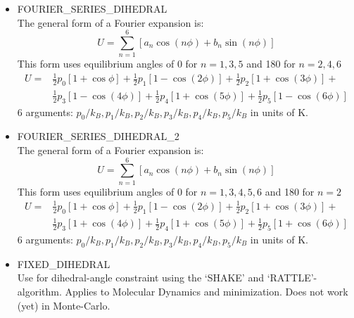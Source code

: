 \begin{itemize}
  \item{FOURIER\_SERIES\_DIHEDRAL}\\
  The general form of a Fourier expansion is:
  \begin{equation}
  U=\sum_{n=1}^6\left[a_n\cos\left(n\phi\right)+b_n\sin\left(n\phi\right)\right]
  \end{equation}
  This form uses equilibrium angles of 0 for $n=1,3,5$ and 180 for $n=2,4,6$
  \begin{equation}
  \begin{split}
  U=&\frac{1}{2}p_0\left[1+\cos\phi\right]+
    \frac{1}{2}p_1\left[1-\cos\left(2\phi\right)\right]+
    \frac{1}{2}p_2\left[1+\cos\left(3\phi\right)\right]+\\
    &\frac{1}{2}p_3\left[1-\cos\left(4\phi\right)\right]+
    \frac{1}{2}p_4\left[1+\cos\left(5\phi\right)\right]+
    \frac{1}{2}p_5\left[1-\cos\left(6\phi\right)\right]
  \end{split}
  \end{equation}
  6 arguments: $p_0/k_B,p_1/k_B,p_2/k_B,p_3/k_B,p_4/k_B,p_5/k_B$ in units of K.

  \item{FOURIER\_SERIES\_DIHEDRAL\_2}\\
  The general form of a Fourier expansion is:
  \begin{equation}
  U=\sum_{n=1}^6\left[a_n\cos\left(n\phi\right)+b_n\sin\left(n\phi\right)\right]
  \end{equation}
  This form uses equilibrium angles of 0 for $n=1,3,4,5,6$ and 180 for $n=2$
  \begin{equation}
  \begin{split}
  U=&\frac{1}{2}p_0\left[1+\cos\phi\right]+
    \frac{1}{2}p_1\left[1-\cos\left(2\phi\right)\right]+
    \frac{1}{2}p_2\left[1+\cos\left(3\phi\right)\right]+\\
    &\frac{1}{2}p_3\left[1+\cos\left(4\phi\right)\right]+
    \frac{1}{2}p_4\left[1+\cos\left(5\phi\right)\right]+
    \frac{1}{2}p_5\left[1+\cos\left(6\phi\right)\right]
  \end{split}
  \end{equation}
  6 arguments: $p_0/k_B,p_1/k_B,p_2/k_B,p_3/k_B,p_4/k_B,p_5/k_B$ in units of K.

  \item{FIXED\_DIHEDRAL}\\
   Use for dihedral-angle constraint using the `SHAKE' and `RATTLE'-algorithm. 
   Applies to Molecular Dynamics and minimization. Does not work (yet) in Monte-Carlo.
\end{itemize}

